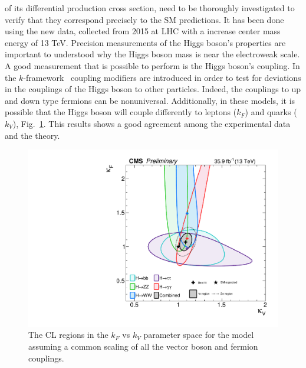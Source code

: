 of its differential production cross section, need to be thoroughly investigated to verify
that they correspond precisely to the SM predictions. It has been done using the new data, collected from 2015 at LHC with a increase center mass energy of 13 TeV.
Precision measurements of the Higgs boson’s properties are important to understood why the Higgs
boson mass is near the electroweak scale. A good measurement that is possible to perform is the  Higgs boson's coupling. In the $k$-framework~\cite{Heinemeyer:2013tqa}  coupling modifiers are introduced in order to test for deviations in the couplings of the Higgs boson to other particles.  
Indeed, the couplings to up and down type fermions can be nonuniversal.  Additionally, in these models,
it is possible that the Higgs boson will couple differently to leptons ($k_F$) and quarks ($k_V$), Fig.~\ref{Figure_016}. This results shows a good agreement among the experimental  data and the theory.
\begin{figure}
\centering
\includegraphics[scale= 0.4]{../Cap1/Figure_016}
\caption{The  CL regions in the $k_F$ vs $k_V$ parameter space for the model assuming a common scaling of all the vector boson and fermion couplings.}
\label{Figure_016}
\end{figure}  




